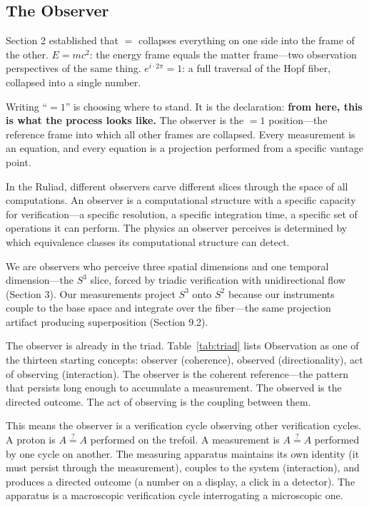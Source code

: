 \documentclass[12pt]{article}
\begin{document}
\subsection{The Observer}

Section 2 established that $=$ collapses everything on one side into the frame of the other. $E = mc^2$: the energy frame equals the matter frame---two observation perspectives of the same thing. $e^{i \cdot 2\pi} = 1$: a full traversal of the Hopf fiber, collapsed into a single number.

Writing ``$= 1$'' is choosing where to stand. It is the declaration: \textbf{from here, this is what the process looks like.} The observer is the $= 1$ position---the reference frame into which all other frames are collapsed. Every measurement is an equation, and every equation is a projection performed from a specific vantage point.

In the Ruliad, different observers carve different slices through the space of all computations. An observer is a computational structure with a specific capacity for verification---a specific resolution, a specific integration time, a specific set of operations it can perform. The physics an observer perceives is determined by which equivalence classes its computational structure can detect.

We are observers who perceive three spatial dimensions and one temporal dimension---the $S^3$ slice, forced by triadic verification with unidirectional flow (Section 3). Our measurements project $S^3$ onto $S^2$ because our instruments couple to the base space and integrate over the fiber---the same projection artifact producing superposition (Section 9.2).

The observer is already in the triad. Table~\ref{tab:triad} lists Observation as one of the thirteen starting concepts: observer (coherence), observed (directionality), act of observing (interaction). The observer is the coherent reference---the pattern that persists long enough to accumulate a measurement. The observed is the directed outcome. The act of observing is the coupling between them.

This means the observer is a verification cycle observing other verification cycles. A proton is $A \stackrel{?}{=} A$ performed on the trefoil. A measurement is $A \stackrel{?}{=} A$ performed by one cycle on another. The measuring apparatus maintains its own identity (it must persist through the measurement), couples to the system (interaction), and produces a directed outcome (a number on a display, a click in a detector). The apparatus is a macroscopic verification cycle interrogating a microscopic one.
\end{document}
